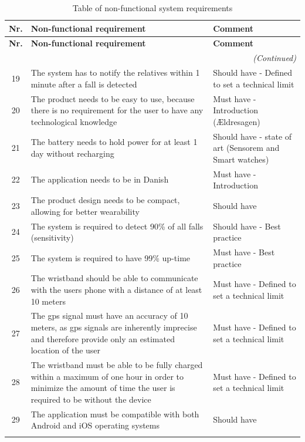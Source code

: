 \begin{longtable}{|c|p{8cm}|p{4cm}|}
\hline
\textbf{Nr.} & \textbf{Non-functional requirement} & \textbf{Comment} \\
\hline
\endfirsthead

\hline
\textbf{Nr.} & \textbf{Non-functional requirement} & \textbf{Comment} \\
\hline
\endhead

\hline
\multicolumn{3}{r}{\textit{(Continued)}} \\
\hline
\endfoot

\hline
\endlastfoot


19 & The system has to notify the relatives within 1 minute after a fall is detected & Should have - Defined to set a technical limit  \\
\hline
20 & The product needs to be easy to use, because there is no requirement for the user to have any technological knowledge & Must have - Introduction (Ældresagen) \\
\hline
21 & The battery needs to hold power for at least 1 day without recharging & Should have - state of art (Sensorem and Smart watches) \\
\hline
22 & The application needs to be in Danish & Must have - Introduction \\
\hline
23 & The product design needs to be compact, allowing for better wearability & Should have \\
\hline
24 & The system is required to detect 90\% of all falls (sensitivity) & Should have - Best practice \\
\hline
25 & The system is required to have 99\% up-time & Must have -  Best practice\\
\hline
26 & The wristband should be able to communicate with the users phone with a distance of at least 10 meters & Must have - Defined to set a technical limit\\
\hline
27 & The \gls{gps} signal must have an accuracy of 10 meters, as \gls{gps} signals are inherently imprecise and therefore provide only an estimated location of the user & Must have - Defined to set a technical limit\\
\hline
28 & The wristband must be able to be fully charged within a maximum of one hour in order to minimize the amount of time the user is required to be without the device & Must have - Defined to set a technical limit\\
\hline
29 & The application must be compatible with both Android and iOS operating systems & Should have \\
\hline
\caption{Table of non-functional system requirements}
\label{tab:ikke_funktionelle_krav_tabel}
\end{longtable}

